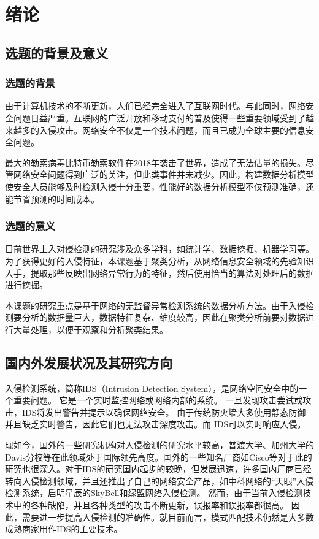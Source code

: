 \section{绪论}

\subsection{选题的背景及意义}
\subsubsection{选题的背景}
由于计算机技术的不断更新，人们已经完全进入了互联网时代。与此同时，网络安全问题日益严重。互联网的广泛开放和移动支付的普及使得一些重要领域受到了越来越多的入侵攻击。网络安全不仅是一个技术问题，而且已成为全球主要的信息安全问题。

最大的勒索病毒比特币勒索软件在2018年袭击了世界，造成了无法估量的损失。尽管网络安全问题得到广泛的关注，但此类事件并未减少。因此，构建数据分析模型使安全人员能够及时检测入侵十分重要，性能好的数据分析模型不仅预测准确，还能节省预测的时间成本。

\subsubsection{选题的意义}
目前世界上入对侵检测的研究涉及众多学科，如统计学、数据挖掘、机器学习等。为了获得更好的入侵特征，本课题基于聚类分析，从网络信息安全领域的先验知识入手，提取那些反映出网络异常行为的特征，然后使用恰当的算法对处理后的数据进行挖掘。

本课题的研究重点是基于网络的无监督异常检测系统的数据分析方法。由于入侵检测要分析的数据量巨大，数据特征复杂、维度较高，因此在聚类分析前要对数据进行大量处理，以便于观察和分析聚类结果。

\subsection{国内外发展状况及其研究方向}

入侵检测系统，简称IDS（Intrusion Detection System），是网络空间安全中的一个重要问题。 它是一个实时监控网络或网络内部的系统。 一旦发现攻击尝试或攻击，IDS将发出警告并提示以确保网络安全。 由于传统防火墙大多使用静态防御并且缺乏实时警告，因此它们也无法攻击深度攻击。而 IDS可以实时响应入侵。

现如今，国外的一些研究机构对入侵检测的研究水平较高，普渡大学、加州大学的Davis分校等在此领域处于国际领先高度。国外的一些知名厂商如Cisco等对于此的研究也很深入。对于IDS的研究国内起步的较晚，但发展迅速，许多国内厂商已经转向入侵检测领域，并且还推出了自己的网络安全产品，如中科网络的“天眼”入侵检测系统，启明星辰的SkyBell和绿盟网络入侵检测。 然而，由于当前入侵检测技术中的各种缺陷，并且各种类型的攻击不断更新，误报率和误报率都很高。 因此，需要进一步提高入侵检测的准确性。就目前而言，模式匹配技术仍然是大多数成熟商家用作IDS的主要技术。

